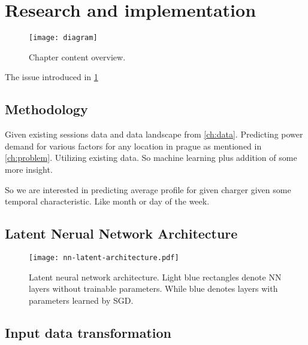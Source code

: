 \chapter{Research and implementation}
\label{ch:problem}

\begin{figure*}[hb]
    \texttt{[image: diagram]}
    \caption[Problem modelling overview]{Chapter content overview. }
\end{figure*}

The issue introduced in \ref{ch:problem}


\section{Methodology}

Given existing sessions data and data landscape from \autoref{ch:data}. Predicting power demand for various factors for any location in prague as mentioned in \autoref{ch:problem}. Utilizing existing data. So machine learning plus addition of some more insight.

So we are interested in predicting average profile for given charger given some temporal characteristic. Like month or day of the week.


\section{Latent Nerual Network Architecture}


\begin{figure}[hb]
    \texttt{[image: nn-latent-architecture.pdf]}
    \caption[Latent Neural Network Architecture]{Latent neural network architecture. Light blue rectangles denote NN layers without trainable parameters. While blue denotes layers with parameters learned by SGD. }
    \label{fig:nn-latent}
\end{figure}




\section{Input data transformation}

